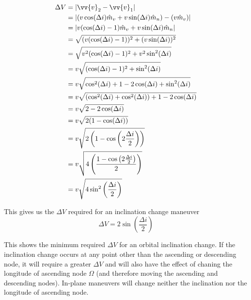 \documentclass[../main.tex]{subfiles}
\begin{document}
\begin{align*}
    \Delta V & = |\vv{v}_2-\vv{v}_1|                                                    \\
             & = |(v\cos(\Delta i)\hat{m}_v+v\sin(\Delta i)\hat{m}_n)-(v\hat{m}_v)|     \\
             & = |v(\cos(\Delta i)-1)\hat{m}_v+v\sin(\Delta i)\hat{m}_n|                \\
             & = \sqrt{(v(\cos(\Delta i)-1))^2+(v\sin(\Delta i))^2}                     \\
             & = \sqrt{v^2(\cos(\Delta i)-1)^2+v^2\sin^2(\Delta i)}                     \\
             & = v\sqrt{(\cos(\Delta i)-1)^2+\sin^2(\Delta i)}                          \\
             & = v\sqrt{\cos^2(\Delta i)+1-2\cos(\Delta i)+\sin^2(\Delta i)}            \\
             & = v\sqrt{(\cos^2(\Delta i)+\cos^2(\Delta i))+1-2\cos(\Delta i)}          \\
             & = v\sqrt{2-2\cos(\Delta i)}                                              \\
             & = v\sqrt{2(1-\cos(\Delta i))}                                            \\
             & = v\sqrt{2\left(1-\cos\left(2\frac{\Delta i}{2}\right)\right)}           \\
             & = v\sqrt{4\left(\frac{1-\cos\left(2\frac{\Delta i}{2}\right)}{2}\right)} \\
             & = v\sqrt{4\sin^2\left(\frac{\Delta i}{2}\right)}                         \\
\end{align*}

This gives us the $\Delta V$ required for an inclination change maneuver
\begin{equation}
    \Delta V= 2\sin\left(\frac{\Delta i}{2}\right)
\end{equation}

This shows the minimum required $\Delta V$ for an orbital inclination change. If the inclination change occurs at any point other than the ascending or descending node, it will require a greater $\Delta V$ and will also have the effect of chaning the longitude of ascending node $\Omega$ (and therefore moving the ascending and descending nodes). In-plane maneuvers will change neither the inclination nor the longitude of ascending node.
\end{document}
